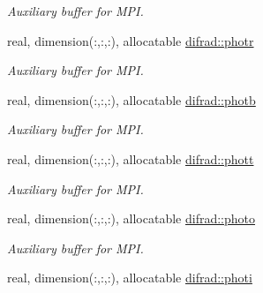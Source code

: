 \begin{DoxyCompactItemize}
\begin{DoxyCompactList}\small\item\em Auxiliary buffer for M\+P\+I. \end{DoxyCompactList}\item 
\hypertarget{namespacedifrad_adf49e979d01582a3c0032f9bde3c4555}{}real, dimension(\+:,\+:,\+:), allocatable \hyperlink{namespacedifrad_adf49e979d01582a3c0032f9bde3c4555}{difrad\+::photr}\label{namespacedifrad_adf49e979d01582a3c0032f9bde3c4555}

\begin{DoxyCompactList}\small\item\em Auxiliary buffer for M\+P\+I. \end{DoxyCompactList}\item 
\hypertarget{namespacedifrad_a65e54816218f7e0acae4ffeaaf9523f6}{}real, dimension(\+:,\+:,\+:), allocatable \hyperlink{namespacedifrad_a65e54816218f7e0acae4ffeaaf9523f6}{difrad\+::photb}\label{namespacedifrad_a65e54816218f7e0acae4ffeaaf9523f6}

\begin{DoxyCompactList}\small\item\em Auxiliary buffer for M\+P\+I. \end{DoxyCompactList}\item 
\hypertarget{namespacedifrad_a28892e6d6f67cbcb8b65e79132cf959b}{}real, dimension(\+:,\+:,\+:), allocatable \hyperlink{namespacedifrad_a28892e6d6f67cbcb8b65e79132cf959b}{difrad\+::phott}\label{namespacedifrad_a28892e6d6f67cbcb8b65e79132cf959b}

\begin{DoxyCompactList}\small\item\em Auxiliary buffer for M\+P\+I. \end{DoxyCompactList}\item 
\hypertarget{namespacedifrad_a73a81002fda23212ff6d9d8b6d161f32}{}real, dimension(\+:,\+:,\+:), allocatable \hyperlink{namespacedifrad_a73a81002fda23212ff6d9d8b6d161f32}{difrad\+::photo}\label{namespacedifrad_a73a81002fda23212ff6d9d8b6d161f32}

\begin{DoxyCompactList}\small\item\em Auxiliary buffer for M\+P\+I. \end{DoxyCompactList}\item 
\hypertarget{namespacedifrad_afa84bdf37b43d72b3e3e3b3c6291807e}{}real, dimension(\+:,\+:,\+:), allocatable \hyperlink{namespacedifrad_afa84bdf37b43d72b3e3e3b3c6291807e}{difrad\+::photi}\label{namespacedifrad_afa84bdf37b43d72b3e3e3b3c6291807e}


\end{DoxyCompactItemize}
